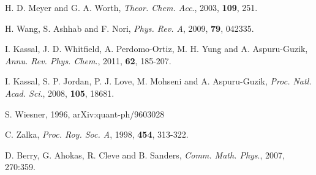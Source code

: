 \documentclass[8.5pt,twoside,twocolumn]{article}
\begin{document}
\begin{thebibliography}{99}
H. D. Meyer and G. A. Worth, \emph{Theor. Chem. Acc}., 2003, \textbf{109}, 251.

H. Wang, S. Ashhab and F. Nori, \emph{Phys. Rev. A}, 2009, \textbf{79}, 042335.

I. Kassal, J. D. Whitfield, A. Perdomo-Ortiz, M. H. Yung and A. Aspuru-Guzik, \emph{Annu. Rev. Phys. Chem}., 2011, \textbf{62}, 185-207.

I. Kassal, S. P. Jordan, P. J. Love, M. Mohseni and A. Aspuru-Guzik, \emph{Proc. Natl. Acad. Sci}., 2008, \textbf{105}, 18681.

S. Wiesner, 1996, arXiv:quant-ph/9603028

C. Zalka, \emph{Proc. Roy. Soc. A}, 1998, \textbf{454}, 313-322.










D. Berry, G. Ahokas, R. Cleve and B. Sanders, \emph{Comm. Math. Phys}., 2007, 270:359.


\end{thebibliography}
\end{document}
